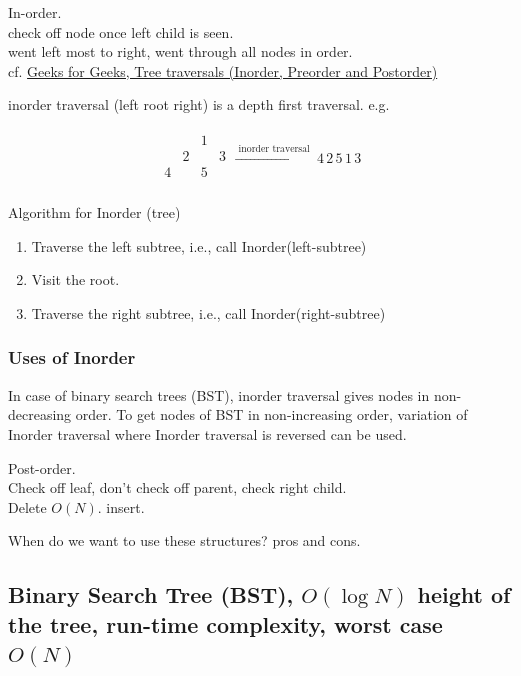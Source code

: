\documentclass[10pt]{amsart}
\begin{document}
\begin{multicols*}{2}
In-order. \\
check off node once left child is seen. \\
went left most to right, went through all nodes in order. \\

cf. \href{https://www.geeksforgeeks.org/tree-traversals-inorder-preorder-and-postorder/}{Geeks for Geeks, Tree traversals (Inorder, Preorder and Postorder)}

inorder traversal (left root right) is a depth first traversal. e.g.

\[
\begin{gathered}
\begin{matrix}
	& & 1 & \\
	& 2 & & 3 \\
	4 & & 5 & \\
\end{matrix} \xrightarrow{ \text{ inorder traversal } } 4 \, 2 \, 5 \, 1 \, 3
\end{gathered}
\]

Algorithm for Inorder (tree)
\begin{enumerate}
	\item Traverse the left subtree, i.e., call Inorder(left-subtree)
	\item Visit the root.
	\item Traverse the right subtree, i.e., call Inorder(right-subtree)
\end{enumerate}

\subsubsection{Uses of Inorder} In case of binary search trees (BST), inorder traversal gives nodes in non-decreasing order. To get nodes of BST in non-increasing order, variation of Inorder traversal where Inorder traversal is reversed can be used.

Post-order. \\
Check off leaf, don't check off parent, check right child. \\

Delete $O(N)$.
insert.

When do we want to use these structures? pros and cons.

\subsection{Binary Search Tree (BST), $O(\log{N})$ height of the tree, run-time complexity, worst case $O(N)$}


\end{multicols*}
\end{document}
